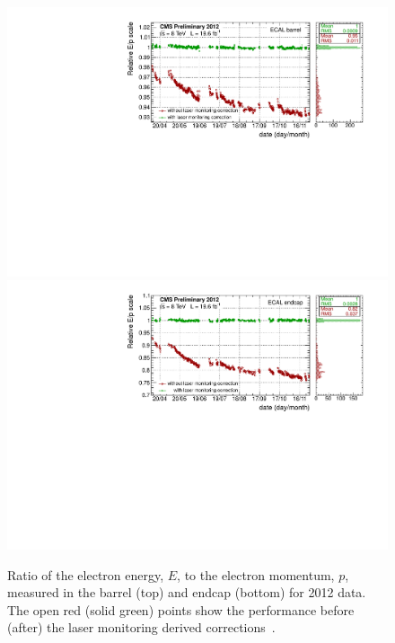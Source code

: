 \begin{figure}
  \includegraphics[width=\textwidth]{cms_experiment/plots/ecal_EB_lasercorrs.pdf} \\
  \includegraphics[width=\textwidth]{cms_experiment/plots/ecal_EE_lasercorrs.pdf} 
  \caption[\acs{ECAL} laser corrections]{Ratio of the electron energy, $E$, to the electron momentum, $p$, measured in the \CMS barrel (top) and endcap (bottom) for 2012 data. The open red (solid green) points show the performance before (after) the laser monitoring derived corrections~\cite{cms-ecal-performance-2012}.}
  \label{fig:ecal_laser_corrs}
\end{figure}

